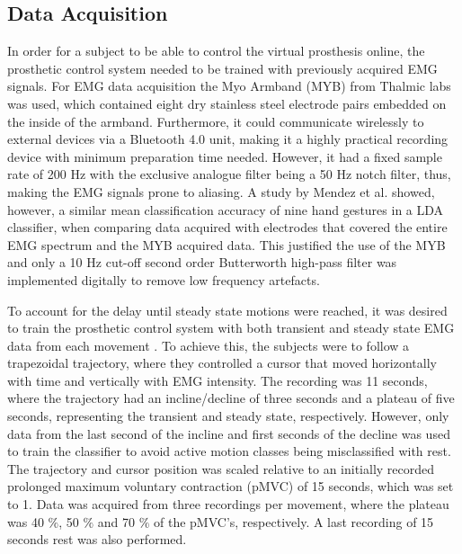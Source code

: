 \subsection{Data Acquisition}

In order for a subject to be able to control the virtual prosthesis online, the prosthetic control system needed to be trained with previously acquired EMG signals. For EMG data acquisition the Myo Armband (MYB) from Thalmic labs was used, which contained eight dry stainless steel electrode pairs embedded on the inside of the armband. Furthermore, it could communicate wirelessly to external devices via a Bluetooth 4.0 unit, making it a highly practical recording device with minimum preparation time needed. However, it had a fixed sample rate of 200 Hz with the exclusive analogue filter being a 50 Hz notch filter, thus, making the EMG signals prone to aliasing. A study by Mendez et al. \cite{Mendez2017} showed, however, a similar mean classification accuracy of nine hand gestures in a LDA classifier, when comparing data acquired with electrodes that covered the entire EMG spectrum and the MYB acquired data. This justified the use of the MYB and only a 10 Hz cut-off second order Butterworth high-pass filter was implemented digitally to remove low frequency artefacts.

To account for the delay until steady state motions were reached, it was desired to train the prosthetic control system with both transient and steady state EMG data from each movement \cite{Boschmann2013}. To achieve this, the subjects were to follow a trapezoidal trajectory, where they controlled a cursor that moved horizontally with time and vertically with EMG intensity. The recording was 11 seconds, where the trajectory had an incline/decline of three seconds and a plateau of five seconds, representing the transient and steady state, respectively. However, only data from the last second of the incline and first seconds of the decline was used to train the classifier to avoid active motion classes being misclassified with rest. The trajectory and cursor position was scaled relative to an initially recorded prolonged maximum voluntary contraction (pMVC) of 15 seconds, which was set to 1. Data was acquired from three recordings per movement, where the plateau was 40 $\%$, 50 $\%$ and 70 $\%$ of the pMVC's, respectively. A last recording of 15 seconds rest was also performed.

